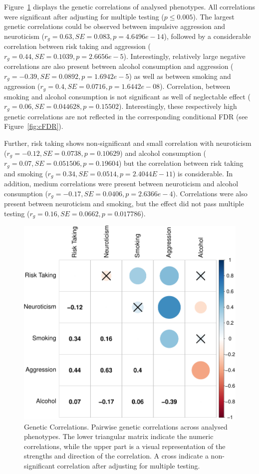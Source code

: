 Figure~\ref{fig:gcor} displays the genetic correlations of analysed phenotypes.
All correlations were significant after adjusting for multiple testing ($p\leq0.005$).
The largest genetic correlations could be observed between impulsive aggression and neuroticism ($r_g=0.63, SE=0.083, p=4.6496e-14$), 
followed by a considerable correlation between risk taking and aggression ($r_g=0.44, SE=0.1039, p=2.6656e-5$).
Interestingly, relatively large negative correlations are also present between alcohol consumption and aggression ($r_g=-0.39, SE=0.0892, p=1.6942e-5$)
as well as between smoking and aggression ($r_g=0.4, SE=0.0716, p=1.6442e-08$).
Correlation, between smoking and alcohol consumption is not significant as well of neglectable effect ($r_g=0.06, SE=0.044628, p=0.15502$).
Interestingly, these respectively high genetic correlations are not reflected in the corresponding conditional FDR (see Figure~\ref{fig:cFDR}).

Further, risk taking shows non-significant and small correlation with neuroticism ($r_g=-0.12, SE=0.0738, p=0.10629$) and
alcohol consumption ($r_g=0.07, SE=0.051506, p=0.19604$) but the correlation between risk taking and smoking ($r_g=0.34, SE=0.0514, p=2.4044E-11$) is considerable.
In addition, medium correlations were present between neuroticism and alcohol consumption ($r_g=-0.17, SE=0.0406, p=2.6366e-4$). 
Correlations were also present between neuroticism and smoking, but the effect did not pass multiple testing ($r_g=0.16, SE=0.0662, p=0.017786$).

\begin{figure}[!h]
	\centering
  \includegraphics[width=0.8\linewidth]{figure/genetic_corr/gcorr_plot_circle_full_se.pdf}
  \caption{Genetic Correlations.
    Pairwise genetic correlations across analysed phenotypes.
    The lower triangular matrix indicate the numeric correlations, while the upper part is a visual representation of the strengths and direction of the correlation.
    A cross indicate a non-significant correlation after adjusting for multiple testing.
  }\label{fig:gcor}
\end{figure}


